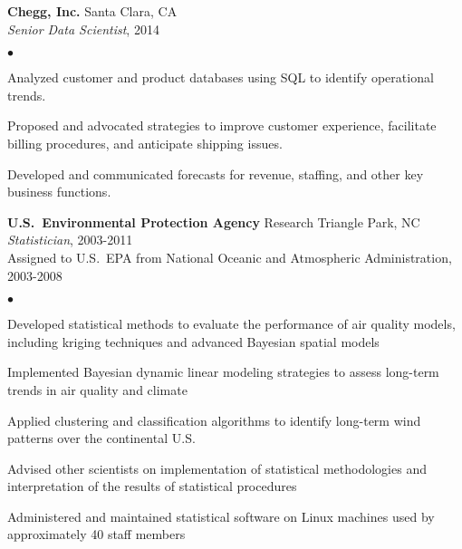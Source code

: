 \documentclass[11pt]{article}
\def\newempl{\vspace*{0.4cm}}
\begin{document}
\newempl
\textbf{Chegg, Inc.}  \hfill Santa Clara, CA\\
\textit{Senior Data Scientist}, 2014 %

\begin{list}{$\bullet$}{
\setlength{\topsep}{0cm}
\setlength{\partopsep}{0cm}
\setlength{\parsep}{0cm}
\setlength{\itemsep}{0cm}
\setlength{\labelsep}{1ex}
\setlength{\labelwidth}{1em}
\setlength{\leftmargin}{1em}
}
\item Analyzed customer and product databases using SQL to identify operational
trends. %
\item Proposed and advocated strategies to improve customer experience,
facilitate billing procedures, and anticipate shipping issues.
\item Developed and communicated forecasts for revenue, staffing, and other key
business functions.
\end{list}



\newempl
\textbf{U.S.\ Environmental Protection Agency}  \hfill Research Triangle Park, NC\\
\textit{Statistician}, 2003-2011\\
Assigned to U.S.~EPA from National Oceanic and Atmospheric Administration,
2003-2008

\begin{list}{$\bullet$}{
\setlength{\topsep}{0cm}
\setlength{\partopsep}{0cm}
\setlength{\parsep}{0cm}
\setlength{\itemsep}{0cm}
\setlength{\labelsep}{1ex}
\setlength{\labelwidth}{1em}
\setlength{\leftmargin}{1em}
}
\item Developed statistical methods to evaluate the performance of
air quality models, including kriging techniques and advanced Bayesian
spatial models
\item Implemented Bayesian dynamic linear modeling strategies to assess
long-term trends in air quality and climate
\item Applied clustering and classification algorithms to identify long-term
wind patterns over the continental U.S.
\item Advised other scientists on implementation of statistical methodologies
and interpretation of the results of statistical procedures
\item Administered and maintained statistical software on Linux machines
used by approximately 40 staff members
\end{list}
\end{document}
